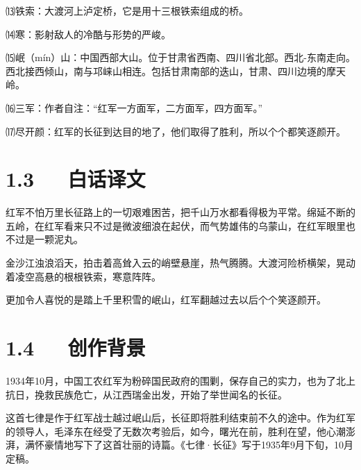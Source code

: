 \documentclass[letterpaper,10pt,english]{sphinxmanual}
\begin{document}
⒀铁索：大渡河上泸定桥，它是用十三根铁索组成的桥。

⒁寒：影射敌人的冷酷与形势的严峻。

⒂岷（mín）山：中国西部大山。位于甘肃省西南、四川省北部。西北-东南走向。西北接西倾山，南与邛崃山相连。包括甘肃南部的迭山，甘肃、四川边境的摩天岭。

⒃三军：作者自注：“红军一方面军，二方面军，四方面军。”

⒄尽开颜：红军的长征到达目的地了，他们取得了胜利，所以个个都笑逐颜开。


\section{1.3   白话译文}
\label{\detokenize{p01_u6563_u6587/_u6bdb_u6cfd_u4e1c-_u4e03_u5f8b_xb7_u957f_u5f81:id5}}
红军不怕万里长征路上的一切艰难困苦，把千山万水都看得极为平常。绵延不断的五岭，在红军看来只不过是微波细浪在起伏，而气势雄伟的乌蒙山，在红军眼里也不过是一颗泥丸。

金沙江浊浪滔天，拍击着高耸入云的峭壁悬崖，热气腾腾。大渡河险桥横架，晃动着凌空高悬的根根铁索，寒意阵阵。

更加令人喜悦的是踏上千里积雪的岷山，红军翻越过去以后个个笑逐颜开。


\section{1.4   创作背景}
\label{\detokenize{p01_u6563_u6587/_u6bdb_u6cfd_u4e1c-_u4e03_u5f8b_xb7_u957f_u5f81:id6}}
1934年10月，中国工农红军为粉碎国民政府的围剿，保存自己的实力，也为了北上抗日，挽救民族危亡，从江西瑞金出发，开始了举世闻名的长征。

这首七律是作于红军战士越过岷山后，长征即将胜利结束前不久的途中。作为红军的领导人，毛泽东在经受了无数次考验后，如今，曙光在前，胜利在望，他心潮澎湃，满怀豪情地写下了这首壮丽的诗篇。《七律·长征》写于1935年9月下旬，10月定稿。
\end{document}
